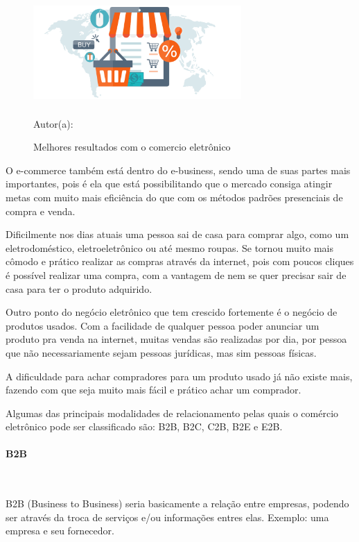  \begin{figure}[!h]
	\centering
	\caption{Melhores resultados com o comercio eletrônico}
	\includegraphics[width=300px, height=150px]{./images/2-6.png}
	\par{Autor(a): \cite{3webbox}}
\end{figure}
\newpage

O e-commerce também está dentro do e-business, sendo uma de suas partes mais importantes, pois é ela que está possibilitando que o mercado consiga atingir metas com muito mais eficiência do que com os métodos padrões presenciais de compra e venda.

Dificilmente nos dias atuais uma pessoa sai de casa para comprar algo, como um eletrodoméstico, eletroeletrônico ou até mesmo roupas. Se tornou muito mais cômodo e prático realizar as compras através da internet, pois com poucos cliques é possível realizar uma compra, com a vantagem de nem se quer precisar sair de casa para ter o produto adquirido.

Outro ponto do negócio eletrônico que tem crescido fortemente é o negócio de produtos usados. Com a facilidade de qualquer pessoa poder anunciar um produto pra venda na internet, muitas vendas são realizadas por dia, por pessoa que não necessariamente sejam pessoas jurídicas, mas sim pessoas físicas.

A dificuldade para achar compradores para um produto usado já não existe mais, fazendo com que seja muito mais fácil e prático achar um comprador.

Algumas das principais modalidades de relacionamento pelas quais o comércio eletrônico pode ser classificado são: B2B, B2C, C2B, B2E e E2B.

\paragraph{B2B}\mbox{}\\
\par
B2B (Business to Business) seria basicamente a relação entre empresas, podendo ser através da troca de serviços e/ou informações entres elas. Exemplo: uma empresa e seu fornecedor.

